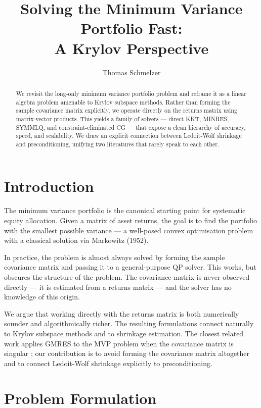 \documentclass[11pt, a4paper]{article}
\title{\textbf{Solving the Minimum Variance Portfolio Fast:\\A Krylov Perspective}}
\author{Thomas Schmelzer}
\date{}
\begin{document}
\maketitle

\begin{abstract}
We revisit the long-only minimum variance portfolio problem and reframe it as a linear algebra problem amenable to Krylov subspace methods. Rather than forming the sample covariance matrix explicitly, we operate directly on the returns matrix using matrix-vector products. This yields a family of solvers — direct KKT, MINRES, SYMMLQ, and constraint-eliminated CG — that expose a clean hierarchy of accuracy, speed, and scalability. We draw an explicit connection between Ledoit-Wolf shrinkage and preconditioning, unifying two literatures that rarely speak to each other.
\end{abstract}

\section{Introduction}

The minimum variance portfolio is the canonical starting point for systematic equity allocation. Given a matrix of asset returns, the goal is to find the portfolio with the smallest possible variance — a well-posed convex optimisation problem with a classical solution via Markowitz (1952).

In practice, the problem is almost always solved by forming the sample covariance matrix and passing it to a general-purpose QP solver. This works, but obscures the structure of the problem. The covariance matrix is never observed directly — it is estimated from a returns matrix — and the solver has no knowledge of this origin.

We argue that working directly with the returns matrix is both numerically sounder and algorithmically richer. The resulting formulations connect naturally to Krylov subspace methods and to shrinkage estimation. The closest related work applies GMRES to the MVP problem when the covariance matrix is singular \cite{bajeux2012}; our contribution is to avoid forming the covariance matrix altogether and to connect Ledoit-Wolf shrinkage explicitly to preconditioning.

\section{Problem Formulation}
\end{document}
